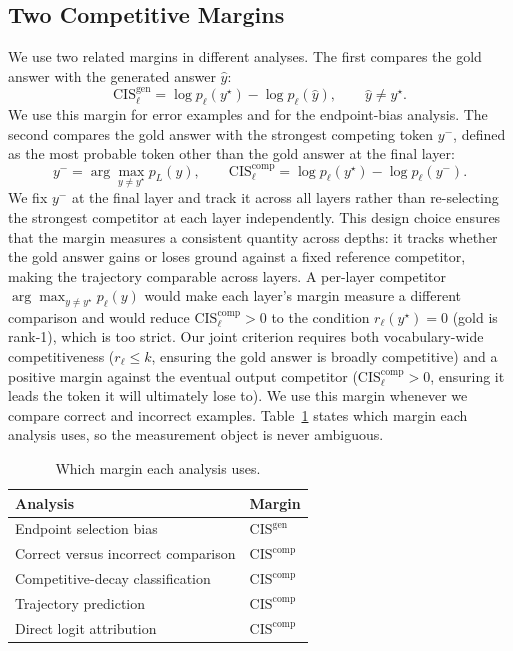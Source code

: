 \documentclass{article} %
\begin{document}
\subsection{Two Competitive Margins}
We use two related margins in different analyses. The first compares the gold answer with the generated answer $\hat{y}$:
\begin{equation}
\mathrm{CIS}^{\mathrm{gen}}_\ell = \log p_\ell(y^\star) - \log p_\ell(\hat{y}), \qquad \hat{y} \neq y^\star .
\end{equation}
We use this margin for error examples and for the endpoint-bias analysis. The second compares the gold answer with the strongest competing token $y^-$, defined as the most probable token other than the gold answer at the final layer:
\begin{equation}
y^- = \arg\max_{y \neq y^\star} p_L(y), \qquad
\mathrm{CIS}^{\mathrm{comp}}_\ell = \log p_\ell(y^\star) - \log p_\ell(y^-) .
\end{equation}
We fix $y^-$ at the final layer and track it across all layers rather than re-selecting the strongest competitor at each layer independently. This design choice ensures that the margin measures a consistent quantity across depths: it tracks whether the gold answer gains or loses ground against a fixed reference competitor, making the trajectory comparable across layers. A per-layer competitor $\arg\max_{y \neq y^\star} p_\ell(y)$ would make each layer's margin measure a different comparison and would reduce $\mathrm{CIS}^{\mathrm{comp}}_\ell > 0$ to the condition $r_\ell(y^\star) = 0$ (gold is rank-1), which is too strict. Our joint criterion requires both vocabulary-wide competitiveness ($r_\ell \le k$, ensuring the gold answer is broadly competitive) and a positive margin against the eventual output competitor ($\mathrm{CIS}^{\mathrm{comp}}_\ell > 0$, ensuring it leads the token it will ultimately lose to). We use this margin whenever we compare correct and incorrect examples. Table~\ref{tab:metric} states which margin each analysis uses, so the measurement object is never ambiguous.

\begin{table}[t]
\centering
\caption{Which margin each analysis uses.}
\label{tab:metric}
\begin{tabular}{ll}
\toprule
\textbf{Analysis} & \textbf{Margin} \\
\midrule
Endpoint selection bias & $\mathrm{CIS}^{\mathrm{gen}}$ \\
Correct versus incorrect comparison & $\mathrm{CIS}^{\mathrm{comp}}$ \\
Competitive-decay classification & $\mathrm{CIS}^{\mathrm{comp}}$ \\
Trajectory prediction & $\mathrm{CIS}^{\mathrm{comp}}$ \\
Direct logit attribution & $\mathrm{CIS}^{\mathrm{comp}}$ \\
\bottomrule
\end{tabular}
\end{table}
\end{document}

